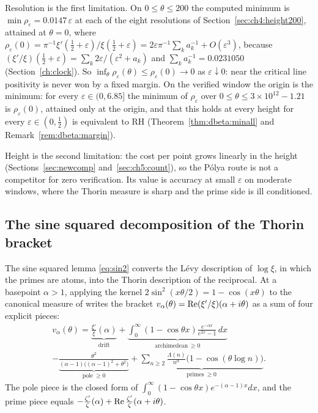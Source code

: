 Resolution is the first limitation. On $0\le\theta\le200$ the computed minimum is $\min\rho_\varepsilon=0.0147\,\varepsilon$ at each of the eight resolutions of Section~\ref{sec:ch4:height200}, attained at $\theta=0$, where $\rho_\varepsilon(0)=\pi^{-1}\xi'(\tfrac12+\varepsilon)/\xi(\tfrac12+\varepsilon)=2\varepsilon\pi^{-1}\sum_ka_k^{-1}+O(\varepsilon^3)$, because $(\xi'/\xi)(\tfrac12+\varepsilon)=\sum_k2\varepsilon/(\varepsilon^2+a_k)$ and $\sum_k a_k^{-1}=0.0231050$ (Section~\ref{ch:clock}). So $\inf_\theta\rho_\varepsilon(\theta)\le\rho_\varepsilon(0)\to0$ as $\varepsilon\downarrow0$: near the critical line positivity is never won by a fixed margin. On the verified window the origin is the minimum: for every $\varepsilon\in(0,6.85]$ the minimum of $\rho_\varepsilon$ over $0\le\theta\le3\times10^{12}-1.21$ is $\rho_\varepsilon(0)$, attained only at the origin, and that this holds at every height for every $\varepsilon\in(0,\frac12)$ is equivalent to RH (Theorem~\ref{thm:dbeta:minall} and Remark~\ref{rem:dbeta:margin}).

Height is the second limitation: the cost per point grows linearly in the height (Sections~\ref{sec:newcomp} and~\ref{sec:ch5:count}), so the P\'olya route is not a competitor for zero verification. Its value is accuracy at small $\varepsilon$ on moderate windows, where the Thorin measure is sharp and the prime side is ill conditioned.

\subsection{The sine squared decomposition of the Thorin bracket}\label{sec:ch6:split}

The sine squared lemma \eqref{eq:sin2} converts the L\'evy description of $\log\xi$, in which the primes are atoms, into the Thorin description of the reciprocal. At a basepoint $\alpha>1$, applying the kernel $2\sin^2(x\theta/2)=1-\cos(x\theta)$ to the canonical measure of \cite[Theorem 8.1]{P26} writes the bracket $v_\alpha(\theta)=\operatorname{Re}(\xi'/\xi)(\alpha+i\theta)$ as a sum of four explicit pieces:
\begin{multline}\label{eq:split}
v_\alpha(\theta)=\underbrace{\frac{\xi'}{\xi}(\alpha)}_{\text{drift}}+\underbrace{\int_0^\infty(1-\cos\theta x)\frac{e^{-\alpha x}}{e^{2x}-1}\,dx}_{\text{archimedean}\ \ge0}\\
-\underbrace{\frac{\theta^2}{(\alpha-1)\big((\alpha-1)^2+\theta^2\big)}}_{\text{pole}\ \ge0}+\underbrace{\sum_{n\ge2}\frac{\Lambda(n)}{n^\alpha}\big(1-\cos(\theta\log n)\big)}_{\text{primes}\ \ge0}.
\end{multline}
The pole piece is the closed form of $\int_0^\infty(1-\cos\theta x)e^{-(\alpha-1)x}dx$, and the prime piece equals $-\tfrac{\zeta'}{\zeta}(\alpha)+\operatorname{Re}\tfrac{\zeta'}{\zeta}(\alpha+i\theta)$.

